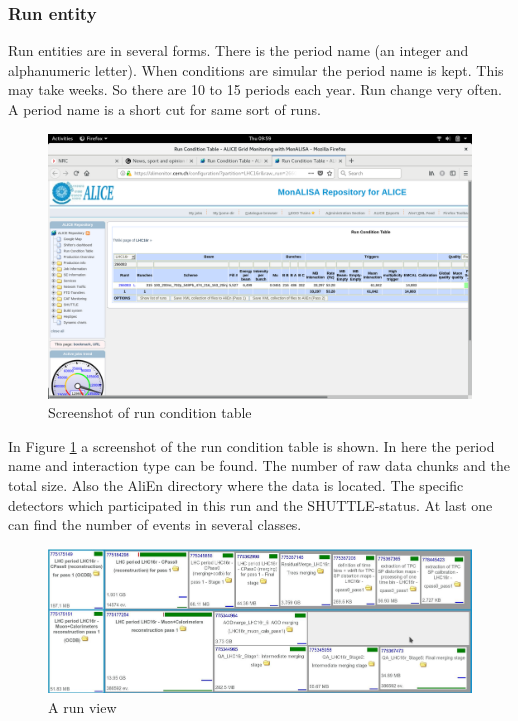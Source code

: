 \subsubsection{Run entity}
Run entities are in several forms. There is the period name (an integer and alphanumeric letter). When conditions are simular the period name is kept. This may take weeks. So there are 10 to 15 periods each year. Run change very often. A period name is a short cut for same sort of runs.
\begin{figure}
  \begin{center}
    \includegraphics[scale=0.15]{./images/run_entity.png}
    \caption{Screenshot of run condition table}
    \label{fig:run_con_table}
  \end{center}
\end{figure}

In Figure \ref{fig:run_con_table} a screenshot of the run condition table is shown. In here the period name and interaction type can be found. The number of raw data chunks and the total size. Also the AliEn directory where the data is located. The specific detectors which participated in this run and the SHUTTLE-status. At last one can find the number of events in several classes.

\begin{figure}[h]
  \begin{center}
    \includegraphics[scale=0.2]{./images/run_view.jpg}
    \caption{A run view}
    \label{fig:run_view}
  \end{center}
\end{figure}


